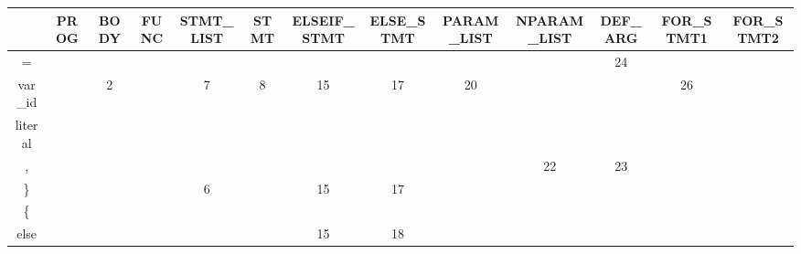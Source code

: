 \documentclass[12pt,a4paper,titlepage,final]{article}
\begin{document}
    \clearpage%
    \thispagestyle{empty}%
    \begin{landscape}%
\begin{table}
    \begin{small}
    \begin{tabular}{|c|c|c|c|c|c|c|c|c|c|c|c|c|} \hline
    ~        & {\scriptsize PROG \par} & {\scriptsize BODY \par} & {\scriptsize FUNC \par} & {\scriptsize STMT\_LIST \par} & {\scriptsize STMT \par} & {\scriptsize ELSEIF\_STMT \par} & {\scriptsize ELSE\_STMT \par} & {\scriptsize PARAM\_LIST \par} & {\scriptsize NPARAM\_LIST \par} & {\scriptsize DEF\_ARG \par} & {\scriptsize FOR\_STMT1 \par} & {\scriptsize FOR\_STMT2 \par} \\ \hline
    =        & ~    & ~    & ~    & ~         & ~    & ~           & ~         & ~          & ~           & 24      & ~         & ~         \\ \hline
    var\_id  & ~    & 2    & ~    & 7         & 8    & 15          & 17        & 20         & ~           & ~       & 26        & ~         \\ \hline
    literal  & ~    & ~    & ~    & ~         & ~    & ~           & ~         & ~          & ~           & ~       & ~         & ~         \\ \hline
    ,        & ~    & ~    & ~    & ~         & ~    & ~           & ~         & ~          & 22          & 23      & ~         & ~         \\ \hline
    \}       & ~    & ~    & ~    & 6         & ~    & 15          & 17        & ~          & ~           & ~       & ~         & ~         \\ \hline
    \{       & ~    & ~    & ~    & ~         & ~    & ~           & ~         & ~          & ~           & ~       & ~         & ~         \\ \hline
    else     & ~    & ~    & ~    & ~         & ~    & 15          & 18        & ~          & ~           & ~       & ~         & ~         \\ \hline

\end{tabular}
\end{small}
\end{table}
\end{landscape}
\end{document}
